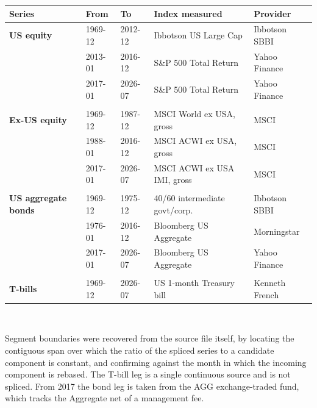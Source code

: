 \small
\begin{tabular}{lllll}
\toprule
Series & From & To & Index measured & Provider \\
\midrule
\textbf{US equity} & 1969-12 & 2012-12 & Ibbotson US Large Cap & Ibbotson SBBI \\
 & 2013-01 & 2016-12 & S\&P 500 Total Return & Yahoo Finance \\
 & 2017-01 & 2026-07 & S\&P 500 Total Return & Yahoo Finance \\
\addlinespace \\
\textbf{Ex-US equity} & 1969-12 & 1987-12 & MSCI World ex USA, gross & MSCI \\
 & 1988-01 & 2016-12 & MSCI ACWI ex USA, gross & MSCI \\
 & 2017-01 & 2026-07 & MSCI ACWI ex USA IMI, gross & MSCI \\
\addlinespace \\
\textbf{US aggregate bonds} & 1969-12 & 1975-12 & 40/60 intermediate govt/corp. & Ibbotson SBBI \\
 & 1976-01 & 2016-12 & Bloomberg US Aggregate & Morningstar \\
 & 2017-01 & 2026-07 & Bloomberg US Aggregate & Yahoo Finance \\
\addlinespace \\
\textbf{T-bills} & 1969-12 & 2026-07 & US 1-month Treasury bill & Kenneth French \\
\bottomrule
\end{tabular}
\\[0.4em]
\begin{minipage}{\linewidth}\footnotesize Segment boundaries were recovered from the source file itself, by locating the contiguous span over which the ratio of the spliced series to a candidate component is constant, and confirming against the month in which the incoming component is rebased. The T-bill leg is a single continuous source and is not spliced. From 2017 the bond leg is taken from the AGG exchange-traded fund, which tracks the Aggregate net of a management fee.\end{minipage}
